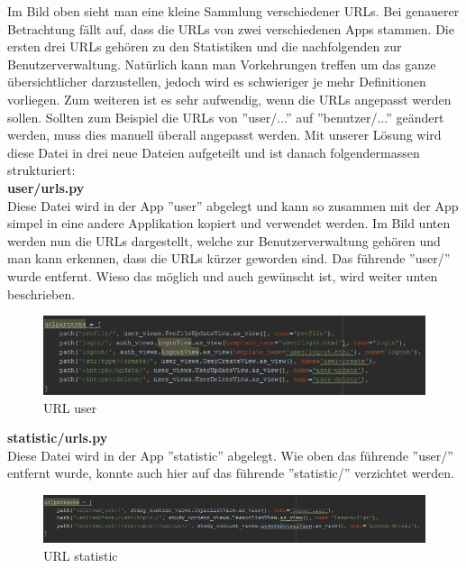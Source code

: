 Im Bild oben sieht man eine kleine Sammlung verschiedener URLs. Bei genauerer Betrachtung fällt auf, dass die URLs von zwei verschiedenen Apps stammen. Die ersten drei URLs gehören zu den Statistiken und die nachfolgenden zur Benutzerverwaltung. Natürlich kann man Vorkehrungen treffen um das ganze übersichtlicher darzustellen, jedoch wird es schwieriger je mehr Definitionen vorliegen. Zum weiteren ist es sehr aufwendig, wenn die URLs angepasst werden sollen. Sollten zum Beispiel die URLs von ''user/...'' auf ''benutzer/...'' geändert werden, muss dies manuell überall angepasst werden. 
Mit unserer Lösung wird diese Datei in drei neue Dateien aufgeteilt und ist danach folgendermassen strukturiert: \\

\textbf{user/urls.py} \\
Diese Datei wird in der App ''user'' abgelegt und kann so zusammen mit der App simpel in eine andere Applikation kopiert und verwendet werden. Im Bild unten werden nun die URLs dargestellt, welche zur Benutzerverwaltung gehören und man kann erkennen, dass die URLs kürzer geworden sind. Das führende ''user/'' wurde entfernt. Wieso das möglich und auch gewünscht ist, wird weiter unten beschrieben. \\
\begin{minipage}{\textwidth}
	\begin{figure}[H]
		\includegraphics[width=\textwidth, height=\textheight, keepaspectratio]{images/URLuser.png}
		\caption{URL user}
	\end{figure}
\end{minipage}


\textbf{statistic/urls.py} \\
Diese Datei wird in der App ''statistic'' abgelegt. Wie oben das führende ''user/'' entfernt wurde, konnte auch hier auf das führende ''statistic/'' verzichtet werden. \\
\begin{minipage}{\textwidth}
	\begin{figure}[H]
		\includegraphics[width=\textwidth, height=\textheight, keepaspectratio]{images/URLstatistic.png}
		\caption{URL statistic}
	\end{figure}
\end{minipage}


